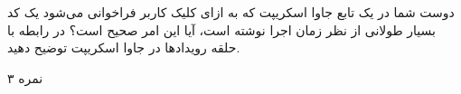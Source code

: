 
دوست شما در یک تابع جاوا اسکریپت که به ازای کلیک کاربر فراخوانی می‌شود یک کد بسیار طولانی از نظر زمان اجرا نوشته است،
آیا این امر صحیح است؟ در رابطه با حلقه رویدادها در جاوا اسکریپت توضیح دهید.

۳ نمره
